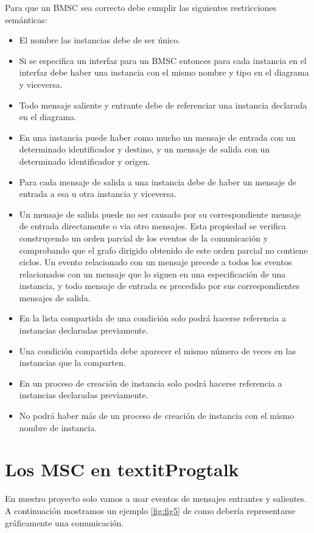 
Para que un BMSC sea correcto debe cumplir las siguientes
restricciones semánticas:
\begin{itemize}
\item El nombre las instancias debe de ser único.
\item Si se especifica un interfaz para un BMSC entonces para cada
instancia en el interfaz debe haber una instancia con el mismo 
nombre y tipo en el diagrama y viceversa.
\item Todo mensaje saliente y entrante debe de referenciar una
instancia declarada en el diagrama.
\item En una instancia puede haber como mucho un mensaje de entrada
con un determinado identificador y destino, y un mensaje de salida con
un determinado identificador y origen.
\item Para cada mensaje de salida a una instancia debe de haber un 
mensaje de entrada a esa u otra instancia y viceversa.
\item Un mensaje de salida puede no ser causado por su correspondiente
mensaje de entrada directamente o via otro mensajes.     
Esta propiedad se verifica construyendo un orden parcial de los 
eventos de la comunicación y comprobando que el grafo dirigido 
obtenido de este orden parcial no contiene ciclos. Un evento
relacionado con un mensaje precede a todos los eventos relacionados
con un mensaje que lo siguen en una especificación de una instancia,
y todo mensaje de entrada es precedido por sus correspondientes 
mensajes de salida.
\item En la lista compartida de una condición solo podrá hacerse
referencia a instancias declaradas previamente.
\item Una condición compartida debe aparecer el mismo número de
veces en las instancias que la comparten.
\item En un proceso de creación de instancia solo podrá hacerse
referencia a instancias declaradas previamente.
\item No podrá haber más de un proceso de creación de instancia con
el mismo nombre de instancia.
\end{itemize}

\section{Los MSC en textit{Progtalk}}
En nuestro proyecto solo vamos a usar eventos de mensajes entrantes y
salientes. A continuación mostramos un ejemplo \ref{fig:fig5} de como
debería representarse gráficamente una comunicación.

